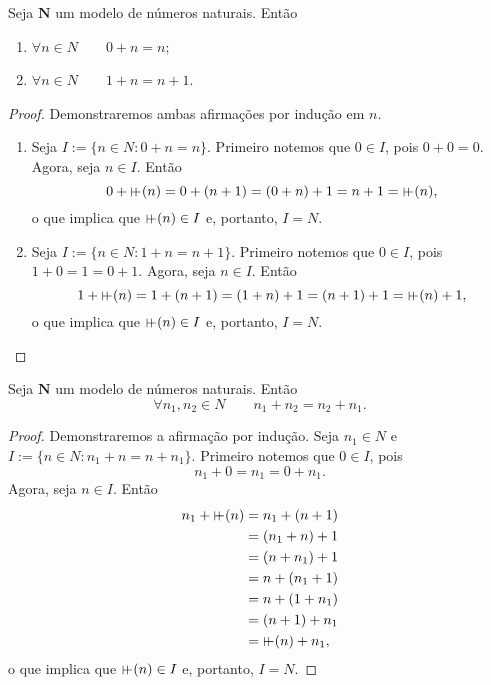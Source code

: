 \begin{lemma} \label{conj.nat.lem.adi}
	Seja $\bm N$ um modelo de números naturais. Então
	\begin{enumerate}
	\item $\forall n \in N \qquad 0+n=n$;
	\item $\forall n \in N \qquad 1+n=n+1$.
	\end{enumerate}
\end{lemma}
\begin{proof}
	Demonstraremos ambas afirmações por indução em $n$.
	\begin{enumerate}
	\item Seja $I := \{n \in N:0+n=n\}$. Primeiro notemos que $0 \in I$, pois $0+0=0$. Agora, seja $n \in I$. Então
	\begin{equation*}
	0+\suce(n)=0+(n+1)=(0+n)+1=n+1=\suce(n),
	\end{equation*}
o que implica que $\suce(n) \in I$ e, portanto, $I=N$.

	\item Seja $I := \{n \in N:1+n=n+1\}$. Primeiro notemos que $0 \in I$, pois $1+0=1=0+1$. Agora, seja $n \in I$. Então
	\begin{equation*}
	1+\suce(n)=1+(n+1)=(1+n)+1=(n+1)+1=\suce(n)+1,
	\end{equation*}
o que implica que $\suce(n) \in I$ e, portanto, $I=N$.
	\end{enumerate}
\end{proof}

\begin{theorem}
	Seja $\bm N$ um modelo de números naturais. Então
	\begin{equation*}
	\forall n_1,n_2 \in N \qquad n_1+n_2 = n_2+n_1.
	\end{equation*}
\end{theorem}
\begin{proof}
 	Demonstraremos a afirmação por indução. Seja $n_1 \in N$ e $I := \{n \in N:n_1+n=n+n_1\}$. Primeiro notemos que $0 \in I$, pois
 	\begin{equation*}
 	n_1+0=n_1=0+n_1.
 	\end{equation*}
Agora, seja $n \in I$. Então
 	\begin{align*}
 	n_1+\suce(n) &= n_1+(n+1) \\
 		&= (n_1+n)+1 \\
 		&= (n+n_1)+1 \\
 		&= n+(n_1+1) \\
 		&= n+(1+n_1) \\
 		&= (n+1)+n_1 \\
 		&= \suce(n)+n_1,
 	\end{align*}
 o que implica que $\suce(n) \in I$ e, portanto, $I=N$.
\end{proof}


